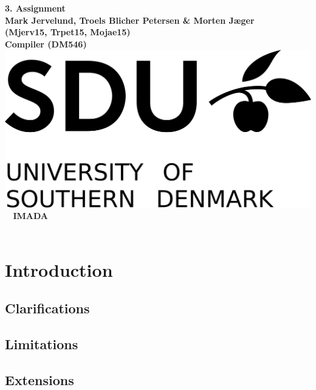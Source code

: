 \documentclass[a4paper,10pt,titlepage]{report}
\begin{document}
\begin{titlepage}
\centering
    \vspace*{9\baselineskip}
    \huge
    \bfseries
    3. Assignment \\
    \normalfont
    Mark Jervelund, Troels Blicher Petersen \& Morten Jæger  \\
    (Mjerv15, Trpet15, Mojae15) \\
	\huge
    Compiler (DM546)  \\[4\baselineskip]
    \normalfont
	\includegraphics[scale=1]{img/SDU_logo}
    \vfill\
    \vspace{5mm}
    IMADA \\

    \textbf{\datedate} \\[2\baselineskip]
\end{titlepage}

\renewcommand{\thepage}{\roman{page}}%
\tableofcontents
\newpage
\setcounter{page}{1}
\renewcommand{\thepage}{\arabic{page}}


\newpage

\section{Introduction}

\subsection{Clarifications}

\subsection{Limitations}

\subsection{Extensions}
\end{document}
